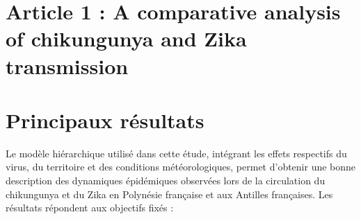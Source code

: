 \section[Article 1]{Article 1 : \guillemotleft A comparative analysis of chikungunya and Zika transmission\guillemotright}




\section{Principaux résultats}

Le modèle hiérarchique utilisé dans cette étude, intégrant les effets respectifs du virus, du territoire et des conditions météorologiques, permet d'obtenir une bonne description des dynamiques épidémiques observées lors de la circulation du chikungunya et du Zika en Polynésie française et aux Antilles françaises.
Les résultats répondent aux objectifs fixés :
